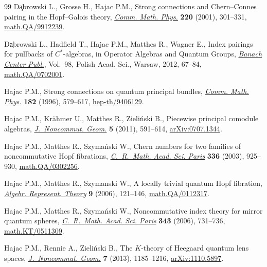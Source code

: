 \documentclass[pdftex]{sigma}
\begin{document}
\begin{thebibliography}{99}
D\c{a}browski L., Grosse H., Hajac P.M., Strong connections and
  {C}hern--{C}onnes pairing in the {H}opf--{G}alois theory, \href{http://dx.doi.org/10.1007/s002200100433}{\textit{Comm. Math.
  Phys.}} \textbf{220} (2001), 301--331, \href{http://arxiv.org/abs/math.QA/9912239}{math.QA/9912239}.

D\c{a}browski L., Hadfield T., Hajac P.M., Matthes R., Wagner E., Index
  pairings for pullbacks of $C^*$-algebras, in Operator Algebras and Quantum
  Groups, \href{http://dx.doi.org/10.4064/bc98-0-4}{\textit{Banach Center Publ.}}, Vol.~98, Polish Acad. Sci., Warsaw,
  2012, 67--84, \href{http://arxiv.org/abs/math.QA/0702001}{math.QA/0702001}.

Hajac P.M., Strong connections on quantum principal bundles, \href{http://dx.doi.org/10.1007/BF02506418}{\textit{Comm.
  Math. Phys.}} \textbf{182} (1996), 579--617, \href{http://arxiv.org/abs/hep-th/9406129}{hep-th/9406129}.

Hajac P.M., Kr{\"a}hmer U., Matthes R., Zieli{\'n}ski B., Piecewise principal
  comodule algebras, \href{http://dx.doi.org/10.4171/JNCG/88}{\textit{J.~Noncommut. Geom.}} \textbf{5} (2011), 591--614,
  \href{http://arxiv.org/abs/0707.1344}{arXiv:0707.1344}.

Hajac P.M., Matthes R., Szyma{\'n}ski W., Chern numbers for two families of
  noncommutative {H}opf fibrations, \href{http://dx.doi.org/10.1016/S1631-073X(03)00190-0}{\textit{C.~R.~Math. Acad. Sci. Paris}}
  \textbf{336} (2003), 925--930, \href{http://arxiv.org/abs/math.QA/0302256}{math.QA/0302256}.

Hajac P.M., Matthes R., Szymanski W., A locally trivial quantum {H}opf
  fibration, \href{http://dx.doi.org/10.1007/s10468-005-3080-y}{\textit{Algebr. Represent. Theory}} \textbf{9} (2006), 121--146,
  \href{http://arxiv.org/abs/math.QA/0112317}{math.QA/0112317}.

Hajac P.M., Matthes R., Szyma{\'n}ski W., Noncommutative index theory for
  mirror quantum spheres, \href{http://dx.doi.org/10.1016/j.crma.2006.09.021}{\textit{C.~R.~Math. Acad. Sci. Paris}} \textbf{343}
  (2006), 731--736, \href{http://arxiv.org/abs/math.KT/0511309}{math.KT/0511309}.

Hajac P.M., Rennie A., Zieli{\'n}ski B., The {$K$}-theory of {H}eegaard quantum
  lens spaces, \href{http://dx.doi.org/10.4171/JNCG/146}{\textit{J.~Noncommut. Geom.}} \textbf{7} (2013), 1185--1216,
  \href{http://arxiv.org/abs/1110.5897}{arXiv:1110.5897}.


\end{thebibliography}
\end{document}
